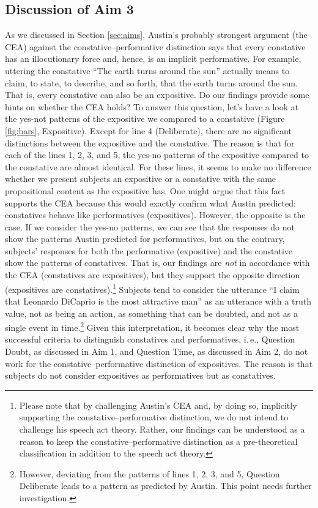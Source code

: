 \documentclass[egregdoesnotlikesansseriftitles,12pt]{scrartcl}
\begin{document}
\subsection{Discussion of Aim 3}
As we discussed in Section \ref{sec:aims}, Austin's probably strongest argument (the CEA) against the constative--performative distinction says that every constative has an illocutionary force and, hence, is an implicit performative. For example, uttering the constative ``The earth turns around the sun'' actually means to claim, to state, to describe, and so forth, that the earth turns around the sun. That is, every constative can also be an expositive. Do our findings provide some hints on whether the CEA holds? To answer this question, let's have a look at the yes-not patterns of the expositive we compared to a constative (Figure \ref{fig:bars}, Expositive). Except for line 4 (Deliberate), there are no significant distinctions between the expositive and the constative. The reason is that for each of the lines 1, 2, 3, and 5, the yes-no patterns of the expositive compared to the constative are almost identical. For these lines, it seems to make no difference whether we present subjects an expositive or a constative with the same propositional content as the expositive has. One might argue that this fact supports the CEA because this would exactly confirm what Austin predicted: constatives behave like performatives (expositives). However, the opposite is the case. If we consider the yes-no patterns, we can see that the responses do not show the patterns Austin predicted for performatives, but on the contrary, subjects' responses for both the performative (expositive) and the constative show the patterns of constatives. That is, our findings are \textit{not} in accordance with the CEA (constatives are expositives), but they support the opposite direction (expositives are constatives).\footnote{Please note that by challenging Austin's CEA and, by doing so, implicitly supporting the constative--performative distinction, we do not intend to challenge his speech act theory. Rather, our findings can be understood as a reason to keep the constative--performative distinction as a pre-theoretical classification in addition to the speech act theory.} Subjects tend to consider the utterance ``I claim that Leonardo DiCaprio is the most attractive man'' as an utterance with a truth value, not as being an action, as something that can be doubted, and not as a single event in time.\footnote{However, deviating from the patterns of lines 1, 2, 3, and 5, Question Deliberate leads to a pattern as predicted by Austin. This point needs further investigation.} Given this interpretation, it becomes clear why the most successful criteria to distinguish constatives and performatives, i.\,e., Question Doubt, as discussed in Aim 1, and Question Time, as discussed in Aim 2, do not work for the constative--performative distinction of expositives. The reason is that subjects do not consider expositives as performatives but as constatives.
\end{document}
